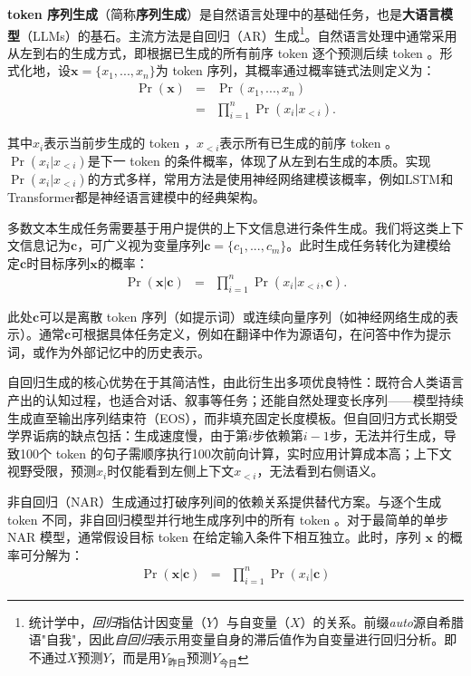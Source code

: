 \textbf{ token 序列生成}（简称\textbf{序列生成}）是自然语言处理中的基础任务，也是\textbf{大语言模型}（LLMs）的基石\citep{radford-etal:2018improving}。主流方法是自回归（AR）生成\footnote{统计学中，\textit{回归}指估计因变量（$Y$）与自变量（$X$）的关系。前缀\textit{auto}源自希腊语"自我"，因此\textit{自回归}表示用变量自身的滞后值作为自变量进行回归分析。即不通过$X$预测$Y$，而是用$Y_{\text{昨日}}$预测$Y_{\text{今日}}$}。自然语言处理中通常采用从左到右的生成方式，即根据已生成的所有前序 token 逐个预测后续 token 。形式化地，设$\mathbf{x} = \{x_1,...,x_n\}$为 token 序列，其概率通过概率链式法则定义为：
\begin{eqnarray}
\Pr(\mathbf{x}) & = & \Pr(x_1,...,x_n) \nonumber \\
& = & \prod_{i=1}^{n} \Pr(x_i|x_{<i}).
\end{eqnarray}

\noindent 其中$x_i$表示当前步生成的 token ，$x_{<i}$表示所有已生成的前序 token 。$\Pr(x_i|x_{<i})$是下一 token 的条件概率，体现了从左到右生成的本质。实现$\Pr(x_i|x_{<i})$的方式多样，常用方法是使用神经网络建模该概率，例如LSTM和Transformer都是神经语言建模中的经典架构。

多数文本生成任务需要基于用户提供的上下文信息进行条件生成。我们将这类上下文信息记为$\mathbf{c}$，可广义视为变量序列$\mathbf{c} = \{c_1,...,c_m\}$。此时生成任务转化为建模给定$\mathbf{c}$时目标序列$\mathbf{x}$的概率：
\begin{eqnarray}
\Pr(\mathbf{x}|\mathbf{c}) & = & \prod_{i=1}^{n} \Pr(x_i|x_{<i},\mathbf{c}).
\end{eqnarray}

\noindent 此处$\mathbf{c}$可以是离散 token 序列（如提示词）或连续向量序列（如神经网络生成的表示）。通常$\mathbf{c}$可根据具体任务定义，例如在翻译中作为源语句，在问答中作为提示词，或作为外部记忆中的历史表示。

自回归生成的核心优势在于其简洁性，由此衍生出多项优良特性：既符合人类语言产出的认知过程，也适合对话、叙事等任务；还能自然处理变长序列——模型持续生成直至输出序列结束符（EOS），而非填充固定长度模板。但自回归方式长期受学界诟病的缺点包括：生成速度慢，由于第$i$步依赖第$i-1$步，无法并行生成，导致100个 token 的句子需顺序执行100次前向计算，实时应用计算成本高；上下文视野受限，预测$x_i$时仅能看到左侧上下文$x_{<i}$，无法看到右侧语义。

非自回归（NAR）生成通过打破序列间的依赖关系提供替代方案\citep{gu-etal:2018non}。与逐个生成 token 不同，非自回归模型并行地生成序列中的所有 token 。对于最简单的单步 NAR 模型，通常假设目标 token 在给定输入条件下相互独立。此时，序列 $\mathbf{x}$ 的概率可分解为：
\begin{eqnarray}
\Pr(\mathbf{x}|\mathbf{c}) & = & \prod_{i=1}^{n} \Pr(x_i|\mathbf{c})
\end{eqnarray}

